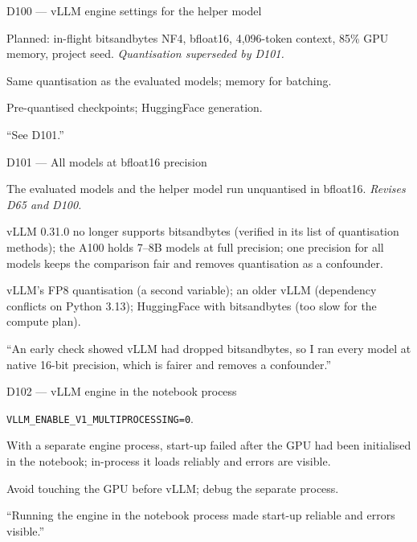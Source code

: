\documentclass[11pt,a4paper]{report}
\begin{document}
\begin{decisionbox}{D100 --- vLLM engine settings for the helper model}
\begin{description}[nosep, leftmargin=0pt]
  \item[Decision.] Planned: in-flight bitsandbytes NF4, bfloat16, 4{,}096-token context, 85\% GPU memory, project seed. \emph{Quantisation superseded by D101.}
  \item[Why.] Same quantisation as the evaluated models; memory for batching.
  \item[Alternatives.] Pre-quantised checkpoints; HuggingFace generation.
  \item[Interview line.] ``See D101.''
\end{description}
\end{decisionbox}

\begin{decisionbox}{D101 --- All models at bfloat16 precision}
\begin{description}[nosep, leftmargin=0pt]
  \item[Decision.] The evaluated models and the helper model run unquantised in bfloat16. \emph{Revises D65 and D100.}
  \item[Why.] vLLM 0.31.0 no longer supports bitsandbytes (verified in its list of quantisation methods); the A100 holds 7--8B models at full precision; one precision for all models keeps the comparison fair and removes quantisation as a confounder.
  \item[Alternatives.] vLLM's FP8 quantisation (a second variable); an older vLLM (dependency conflicts on Python 3.13); HuggingFace with bitsandbytes (too slow for the compute plan).
  \item[Interview line.] ``An early check showed vLLM had dropped bitsandbytes, so I ran every model at native 16-bit precision, which is fairer and removes a confounder.''
\end{description}
\end{decisionbox}

\begin{decisionbox}{D102 --- vLLM engine in the notebook process}
\begin{description}[nosep, leftmargin=0pt]
  \item[Decision.] \texttt{VLLM\_ENABLE\_V1\_MULTIPROCESSING=0}.
  \item[Why.] With a separate engine process, start-up failed after the GPU had been initialised in the notebook; in-process it loads reliably and errors are visible.
  \item[Alternatives.] Avoid touching the GPU before vLLM; debug the separate process.
  \item[Interview line.] ``Running the engine in the notebook process made start-up reliable and errors visible.''
\end{description}
\end{decisionbox}
\end{document}
